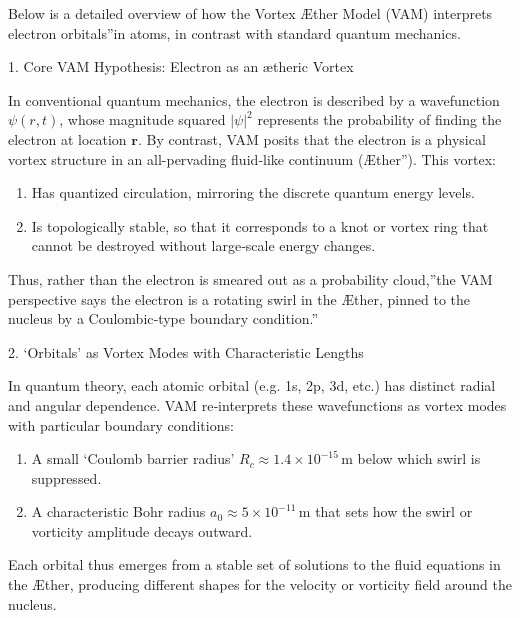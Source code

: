 \documentclass[a4paper,10pt]{article}
\begin{document}
    Below is a detailed overview of how the Vortex Æther Model (VAM) interprets electron \grqq orbitals\textquotedblright in atoms, in contrast with standard quantum mechanics.





1. Core VAM Hypothesis: Electron as an ætheric Vortex

In conventional quantum mechanics, the electron is described by a wavefunction \(\psi(r,t)\), whose magnitude squared \(|\psi|^2\) represents the probability of finding the electron at location \(\mathbf{r}\). By contrast, VAM posits that the electron is a physical vortex structure in an all-pervading fluid‐like continuum (\grqq Æther\textquotedblright). This vortex:

\begin{enumerate}
\item Has quantized circulation, mirroring the discrete quantum energy levels.
\item Is topologically stable, so that it corresponds to a knot or vortex ring that cannot be destroyed without large‐scale energy changes.
\end{enumerate}
Thus, rather than \grqq the electron is smeared out as a probability cloud,\textquotedblright the VAM perspective says \grqq the electron is a rotating swirl in the Æther, pinned to the nucleus by a Coulombic‐type boundary condition.\textquotedblright


2. ‘Orbitals' as Vortex Modes with Characteristic Lengths

In quantum theory, each atomic orbital (e.g. 1s, 2p, 3d, etc.) has distinct radial and angular dependence. VAM re‐interprets these wavefunctions as vortex modes with particular boundary conditions:

\begin{enumerate}
\item A small ‘Coulomb barrier radius' \(R_c \approx 1.4 \times 10^{-15}\,\mathrm{m}\) below which swirl is suppressed.
\item A characteristic Bohr radius \(a_0 \approx 5 \times 10^{-11}\,\mathrm{m}\) that sets how the swirl or vorticity amplitude decays outward.
\end{enumerate}
Each orbital thus emerges from a stable set of solutions to the fluid equations in the Æther, producing different shapes for the velocity or vorticity field around the nucleus.
\end{document}
